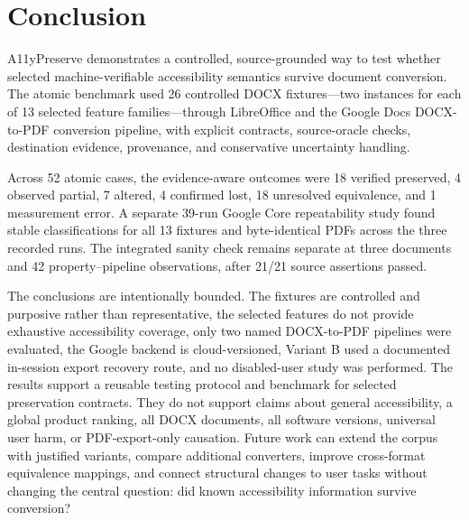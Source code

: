 \section{Conclusion}
\label{sec:conclusion}

A11yPreserve demonstrates a controlled, source-grounded way to test whether selected machine-verifiable accessibility semantics survive document conversion. The atomic benchmark used 26 controlled DOCX fixtures—two instances for each of 13 selected feature families—through LibreOffice and the Google Docs DOCX-to-PDF conversion pipeline, with explicit contracts, source-oracle checks, destination evidence, provenance, and conservative uncertainty handling.

Across 52 atomic cases, the evidence-aware outcomes were 18 verified preserved, 4 observed partial, 7 altered, 4 confirmed lost, 18 unresolved equivalence, and 1 measurement error. A separate 39-run Google Core repeatability study found stable classifications for all 13 fixtures and byte-identical PDFs across the three recorded runs. The integrated sanity check remains separate at three documents and 42 property--pipeline observations, after 21/21 source assertions passed.

The conclusions are intentionally bounded. The fixtures are controlled and purposive rather than representative, the selected features do not provide exhaustive accessibility coverage, only two named DOCX-to-PDF pipelines were evaluated, the Google backend is cloud-versioned, Variant B used a documented in-session export recovery route, and no disabled-user study was performed. The results support a reusable testing protocol and benchmark for selected preservation contracts. They do not support claims about general accessibility, a global product ranking, all DOCX documents, all software versions, universal user harm, or PDF-export-only causation. Future work can extend the corpus with justified variants, compare additional converters, improve cross-format equivalence mappings, and connect structural changes to user tasks without changing the central question: did known accessibility information survive conversion?
